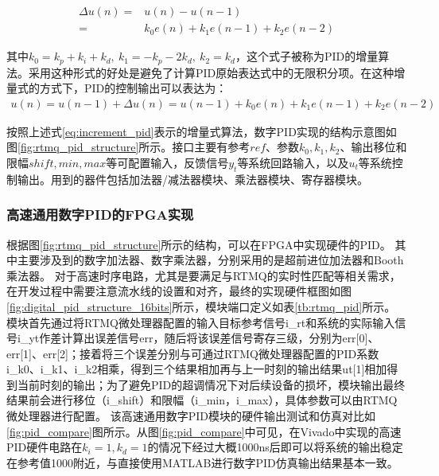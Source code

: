\begin{align}
    \Delta u(n)=&u(n)-u(n-1)\\
    =&k_0 e(n)+k_1 e(n-1)+k_2 e(n-2)
\end{align}

其中$k_0=k_p+k_i+k_d,\ k_1=-k_p-2k_d,\ k_2=k_d$，这个式子被称为PID的增量算法。采用这种形式的好处是避免了计算PID原始表达式中的无限积分项。在这种增量式的方式下，PID的控制输出可以表达为：
\begin{align}
    u(n)=u(n-1)+\Delta u(n)=u(n-1)+k_0 e(n)+k_1 e(n-1)+k_2 e(n-2)\label{eq:increment_pid}
\end{align}

按照上述式\eqref{eq:increment_pid}表示的增量式算法，数字PID实现的结构示意图如图\ref{fig:rtmq_pid_structure}所示。接口主要有参考$ref$、参数$k_0, k_1, k_2$、输出移位和限幅$shift, min, max$等可配置输入，反馈信号$y_t$等系统回路输入，以及$u_t$等系统控制输出。用到的器件包括加法器/减法器模块、乘法器模块、寄存器模块。

\subsubsection[高速通用数字PID的FPGA实现]{高速通用数字PID的FPGA实现}


根据图\ref{fig:rtmq_pid_structure}所示的结构，可以在FPGA中实现硬件的PID。
其中主要涉及到的数字加法器、数字乘法器，分别采用的是超前进位加法器和Booth乘法器。
对于高速时序电路，尤其是要满足与RTMQ的实时性匹配等相关需求，在开发过程中需要注意流水线的设置和对齐，最终的实现硬件框图如图\ref{fig:digital_pid_structure_16bits}所示，模块端口定义如表\ref{tb:rtmq_pid}所示。
模块首先通过将RTMQ微处理器配置的输入目标参考信号i\_rt和系统的实际输入信号i\_yt作差计算出误差信号err，随后将该误差信号寄存三级，分别为err[0]、err[1]、err[2]；接着将三个误差分别与可通过RTMQ微处理器配置的PID系数i\_k0、i\_k1、i\_k2相乘，得到三个结果相加再与上一时刻的输出结果ut[1]相加得到当前时刻的输出；为了避免PID的超调情况下对后续设备的损坏，模块输出最终结果前会进行移位（i\_shift）和限幅（i\_min，i\_max），具体参数可以由RTMQ微处理器进行配置。
该高速通用数字PID模块的硬件输出测试和仿真对比如\ref{fig:pid_compare}图所示。从图\ref{fig:pid_compare}中可见，在Vivado中实现的高速PID硬件电路在$k_i=1, k_d=1$的情况下经过大概1000ns后即可以将系统的输出稳定在参考值1000附近，与直接使用MATLAB进行数字PID仿真输出结果基本一致。

